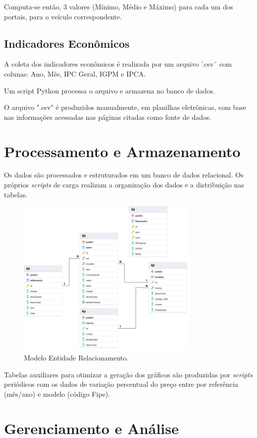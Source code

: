 \documentclass[conference]{IEEEtran}
\begin{document}
Computa-se então, 3 valores (Mínimo, Médio e Máximo) para cada um dos portais, para o veículo correspondente.

\subsection{Indicadores Econômicos}

A coleta dos indicadores econômicos é realizada por um arquivo '.csv´ com colunas: Ano, Mês, IPC Geral, IGPM e IPCA.
 
Um script Python processa o arquivo e armazena no banco de dados.

O arquivo ".csv" é produzidos manualmente, em planilhas eletrônicas, com base nas informações acessadas nas páginas citadas como fonte de dados.

\section{Processamento e Armazenamento}

Os dados são processados e estruturados em um banco de dados relacional. Os próprios \textit{scripts} de carga realizam a organização dos dados e a distribuição nas tabelas.


\begin{figure}[htbp]
	\centerline{\includegraphics[width=250pt]{assets/database.png}}
	\caption{Modelo Entidade Relacionamento.}
	\label{fig1}
\end{figure}

Tabelas auxiliares para otimizar a geração dos gráficos são produzidas por \textit{scripts} periódicos com os dados de variação percentual do preço entre por referência (mês/ano) e modelo (código Fipe).

\section{Gerenciamento e Análise}
\end{document}
